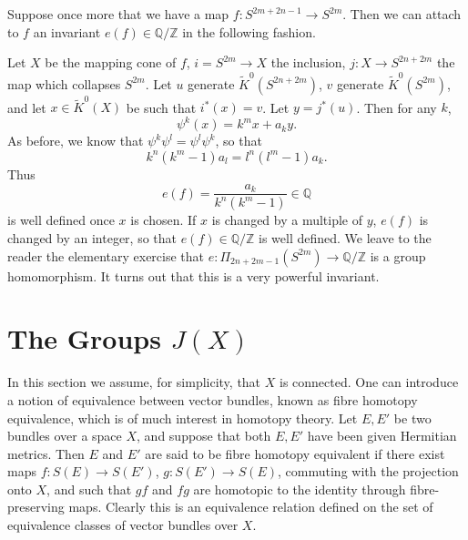 \documentclass[leqno]{book}
\numberwithin{equation}{section}
\theoremstyle{definition}
\begin{document}
            Suppose once more that we have a map $f:S^{2m+2n-1}\to S^{2m}$. Then we can attach to $f$ an invariant $e(f)\in \mathbb{Q}/\mathbb{Z}$ in the following fashion.

            Let $X$ be the mapping cone of $f$, $i=S^{2m}\to X$ the inclusion, $j:X\to S^{2n+2m}$ the map which collapses $S^{2m}$. Let $u$ generate $\tilde{K}^{0}(S^{2n+2m})$, $v$ generate $\tilde{K}^{0}(S^{2m})$, and let $x \in \tilde{K}^{0}(X)$ be such that $i^{*}(x)=v$. Let $y=j^{*}(u)$. Then for any $k$, 
            \begin{equation*}
              \psi^{k}(x)=k^{m}x+a_{k}y.
            \end{equation*}
            As before, we know that $\psi^{k}\psi^{l}=\psi^{l}\psi^{k}$, so that 
            \begin{equation*}
              k^{n}(k^{m}-1)a_{l}=l^{n}(l^{m}-1)a_{k}.
            \end{equation*}
            Thus 
            \begin{equation*}
              e(f)=\frac{a_{k}}{k^{n}(k^{m}-1)}\in \mathbb{Q}
            \end{equation*}
            is well defined once $x$ is chosen. If $x$ is changed by a multiple of $y$, $e(f)$ is changed by an integer, so that $e(f)\in \mathbb{Q}/\mathbb{Z}$ is well defined. We leave to the reader the elementary exercise that $e: \Pi_{2n+2m-1}(S^{2m})\to \mathbb{Q}/\mathbb{Z}$ is a group homomorphism. It turns out that this is a very powerful invariant.

        \section{The Groups $J(X)$}
            
            In this section we assume, for simplicity, that $X$ is connected. One can introduce a notion of equivalence between vector bundles, known as fibre homotopy equivalence, which is of much interest in homotopy theory. Let $E,E'$ be two bundles over a space $X$, and suppose that both $E,E'$ have been given Hermitian metrics. Then $E$ and $E'$ are said to be fibre homotopy equivalent if there exist maps $f:S(E)\to S(E')$, $g:S(E')\to S(E)$, commuting with the projection onto $X$, and such that $gf$ and $fg$ are homotopic to the identity through fibre-preserving maps. Clearly this is an equivalence relation defined on the set of equivalence classes of vector bundles over $X$.
\end{document}
